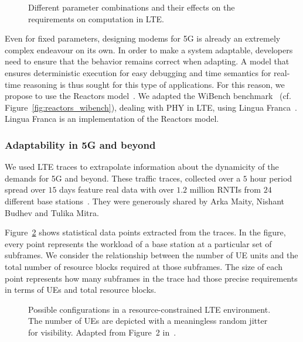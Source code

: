 \begin{figure}[t]
	\centering
	\caption{Different parameter combinations and their effects on the requirements on computation in \ac{LTE}.}
	\label{fig:5g_radar}
\end{figure}
        
Even for fixed parameters, designing modems for 5G is already an extremely complex endeavour on its own. 
In order to make a system adaptable, developers need to ensure that the behavior remains correct when adapting.
A model that ensures deterministic execution for easy debugging and time semantics for real-time reasoning is thus sought for this type of applications. 
For this reason, we propose to use the Reactors model~\cite{wittig_ict20}.
We adapted the WiBench benchmark~\cite{wibench} (cf. Figure~\ref{fig:reactors_wibench}), dealing with \acs{PHY} in \ac{LTE}, using Lingua Franca~\cite{lingua_franca}.
Lingua Franca is an implementation of the Reactors model.

\subsubsection{Adaptability in 5G and beyond}

We used LTE traces to extrapolate information about the dynamicity of the demands for 5G and beyond.
These traffic traces, collected over a $5$ hour period spread over $15$ days feature real data with over $1.2$ million \acp{RNTI} from $24$ different base stations~\cite{budhdev2020isoran}.
They were generously shared by Arka Maity, Nishant Budhev and Tulika Mitra.

Figure~\ref{fig:statistics} shows statistical data points extracted from the traces.
In the figure, every point represents the workload of a base station at a particular set of subframes.
We consider the relationship between the number of \ac{UE} units and the total number of resource blocks required at those subframes.
The size of each point represents how many subframes in the trace had those precise requirements in terms of \acp{UE} and total resource blocks.

\begin{figure}[t]
	\centering
	\caption{Possible configurations in a resource-constrained \acs{LTE} environment. The number of UEs are depicted with a meaningless random jitter for visibility. Adapted from Figure~2 in~\cite{wittig_ict20}.}
	\label{fig:statistics}
\end{figure}

